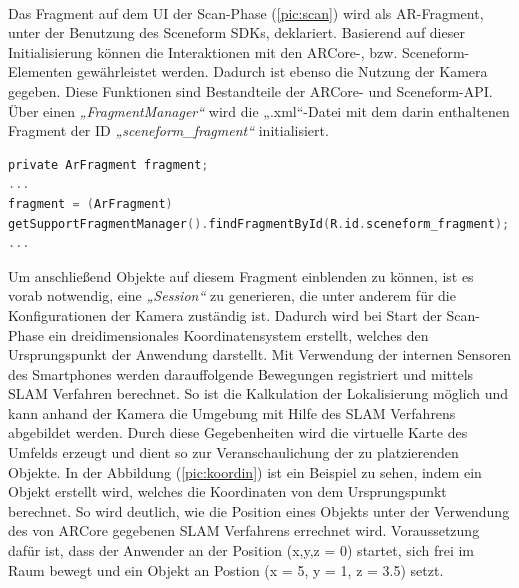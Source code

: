 \\ 
Das Fragment auf dem \acl{UI} der Scan-Phase (\ref{pic:scan}) wird als \acs{AR}-Fragment, unter der Benutzung des Sceneform \acs{SDK}s, deklariert. Basierend auf 
dieser Initialisierung können die Interaktionen mit den ARCore-, bzw. Sceneform- Elementen gewährleistet werden. Dadurch ist ebenso die Nutzung der Kamera 
gegeben. Diese Funktionen sind Bestandteile der ARCore- und Sceneform-\acs{API}. Über einen \textit{„FragmentManager“} wird die „.xml“-Datei mit dem darin 
enthaltenen Fragment der ID \textit{„sceneform\_fragment“} initialisiert.
\\
\begin{lstlisting}[language=C,
    frame=lines,           % Ein Rahmen um den Code (single for box, lines for top and bottom)
    xleftmargin=\parindent,  % Rahmen link von den Zahlen
    style=algoBericht,
    label={code:arfragment},
    captionpos=b,           % Caption unter den Code setzen
caption={Initialisierung des Fragments}]
private ArFragment fragment;
...
fragment = (ArFragment)
getSupportFragmentManager().findFragmentById(R.id.sceneform_fragment);
...
\end{lstlisting}
Um anschließend Objekte auf diesem Fragment einblenden zu können, ist es vorab notwendig, eine \textit{„Session“} zu generieren, die unter anderem für die 
Konfigurationen der Kamera zuständig ist. Dadurch wird bei Start der Scan-Phase ein dreidimensionales Koordinatensystem erstellt, welches den Ursprungspunkt der 
Anwendung darstellt. Mit Verwendung der internen Sensoren des Smartphones werden darauffolgende Bewegungen registriert und mittels \acs{SLAM} Verfahren berechnet. 
So ist die Kalkulation der Lokalisierung möglich und kann anhand der Kamera die Umgebung mit Hilfe des \acs{SLAM} Verfahrens abgebildet werden. Durch diese 
Gegebenheiten wird die virtuelle Karte des Umfelds erzeugt und dient so zur Veranschaulichung der zu platzierenden Objekte. In der Abbildung (\ref{pic:koordin}) 
ist ein Beispiel zu sehen, indem ein Objekt erstellt wird, welches die Koordinaten von dem Ursprungspunkt berechnet. So wird deutlich, wie die Position eines 
Objekts unter der Verwendung des von ARCore gegebenen \acs{SLAM} Verfahrens errechnet wird. Voraussetzung dafür ist, dass der Anwender an der Position (x,y,z = 0) startet, 
sich frei im Raum bewegt und ein Objekt an Postion (x = 5, y = 1, z = 3.5) setzt.
